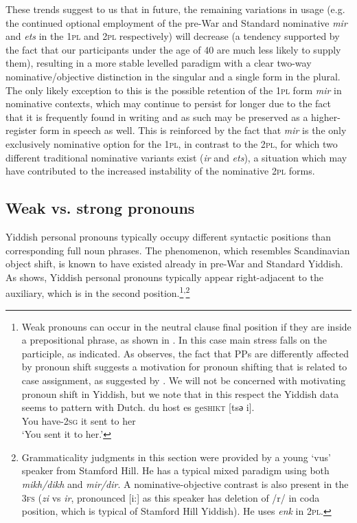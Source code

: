 \documentclass[output=paper, hidelinks]{langscibook}
\begin{document}
These trends suggest to us that in future, the remaining variations in usage (e.g. the continued optional employment of the pre-War and Standard nominative \textit{mir} and \textit{ets} in the 1\textsc{pl} and 2\textsc{pl} respectively) will decrease (a tendency supported by the fact that our participants under the age of 40 are much less likely to supply them), resulting in a more stable levelled paradigm with a clear two-way nominative/objective distinction in the singular and a single form in the plural. The only likely exception to this is the possible retention of the 1\textsc{pl} form \textit{mir} in nominative contexts, which may continue to persist for longer due to the fact that it is frequently found in writing and as such may be preserved as a higher-register form in speech as well. This is reinforced by the fact that \textit{mir} is the only exclusively nominative option for the 1\textsc{pl}, in contrast to the 2\textsc{pl}, for which two different traditional nominative variants exist (\textit{ir} and \textit{ets}), a situation which may have contributed to the increased instability of the nominative 2\textsc{pl} forms.



\subsection{Weak vs. strong pronouns}\label{sec:weakvsstrong}


Yiddish personal pronouns typically occupy different syntactic positions than corresponding full noun phrases. The phenomenon, which resembles Scandinavian object shift, is known to have existed already in pre-War and Standard Yiddish. As  shows, Yiddish personal pronouns typically appear right-adjacent to the auxiliary, which is in the second position.\footnote{Weak pronouns can occur in the neutral clause final position if they are inside a prepositional phrase, as shown in . In this case main stress falls on the participle, as indicated. As \citet{Ruys08} observes, the fact that PPs are differently affected by pronoun shift suggests a motivation for pronoun shifting that is related to case assignment, as suggested by \citet{Neeleman98}. We will not be concerned with motivating pronoun shift in Yiddish, but we note that in this respect the Yiddish data seems to pattern with Dutch.
\ea\label{ex:foo18} \gll du host es ge\textsc{shikt} [tsә i].\\
    You have-2\textsc{sg} it sent to her\\
\glt ‘You sent it to her.’
\z

}\textsuperscript{,}\footnote{Grammaticality judgments in this section were provided by a young `vus' speaker from Stamford Hill. He has a typical mixed paradigm using both \textit{mikh/dikh} and \textit{mir/dir}. A nominative-objective contrast is also present in the 3\textsc{fs} (\textit{zi} vs \textit{ir}, pronounced [i:] as this speaker has deletion of /r/ in coda position, which is typical of Stamford Hill Yiddish). He uses \textit{enk} in 2\textsc{pl}.} 
\end{document}
